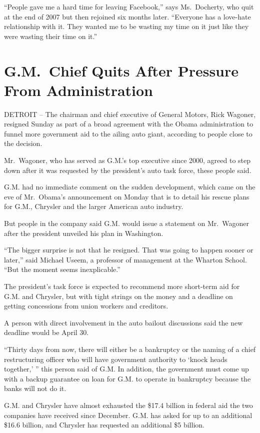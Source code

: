 \documentclass[12pt,a4paper,onecolumn]{article}
\begin{document}
``People gave me a hard time for leaving Facebook,'' says Ms.~Docherty, who quit at the end of 2007
but then rejoined six months later. ``Everyone has a love-hate relationship with it. They wanted me
to be wasting my time on it just like they were wasting their time on it.''

\section{G.M.~Chief Quits After Pressure From Administration}

DETROIT -- The chairman and chief executive of General Motors, Rick Wagoner, resigned Sunday as part
of a broad agreement with the Obama administration to funnel more government aid to the ailing auto
giant, according to people close to the decision.

Mr.~Wagoner, who has served as G.M.'s top executive since 2000, agreed to step down after it was
requested by the president's auto task force, these people said.

G.M. had no immediate comment on the sudden development, which came on the eve of Mr.~Obama's
announcement on Monday that is to detail his rescue plans for G.M., Chrysler and the larger American
auto industry.

But people in the company said G.M. would issue a statement on Mr.~Wagoner after the president
unveiled his plan in Washington.

``The bigger surprise is not that he resigned. That was going to happen sooner or later,'' said
Michael Useem, a professor of management at the Wharton School. ``But the moment seems
inexplicable.''

The president's task force is expected to recommend more short-term aid for G.M. and Chrysler, but
with tight strings on the money and a deadline on getting concessions from union workers and
creditors.

A person with direct involvement in the auto bailout discussions said the new deadline would be
April 30.

``Thirty days from now, there will either be a bankruptcy or the naming of a chief restructuring
officer who will have government authority to `knock heads together,' '' this person said of G.M. In
addition, the government must come up with a backup guarantee on loan for G.M. to operate in
bankruptcy because the banks will not do it.

G.M. and Chrysler have almost exhausted the \$17.4 billion in federal aid the two companies have
received since December. G.M. has asked for up to an additional \$16.6 billion, and Chrysler has
requested an additional \$5 billion.
\end{document}
